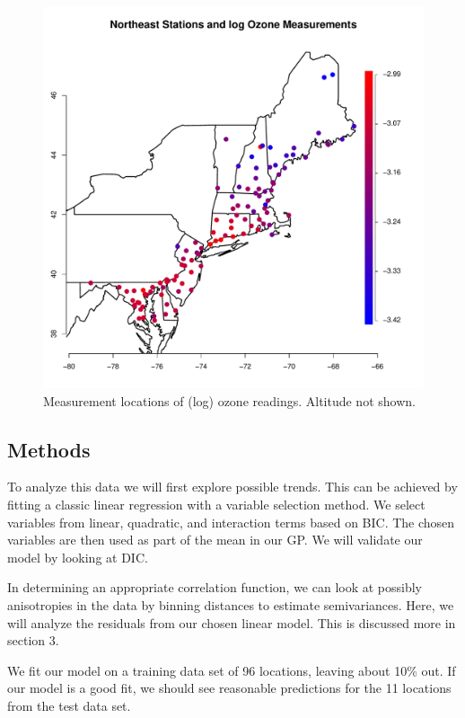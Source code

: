 \documentclass[12pt]{article}
\begin{document}
\begin{figure}[ht]
\begin{center}
\includegraphics[scale=0.40]{figs/data.pdf}
\end{center}
\caption{Measurement locations of (log) ozone readings. Altitude not shown.}
\end{figure}

\subsection{Methods}

To analyze this data we will first explore possible trends. This can be achieved by fitting a classic linear regression with a variable selection method. We select variables from linear, quadratic, and interaction terms based on BIC. The chosen variables are then used as part of the mean in our GP. We will validate our model by looking at DIC.
\bigskip

In determining an appropriate correlation function, we can look at possibly anisotropies in the data by binning distances to estimate semivariances. Here, we will analyze the residuals from our chosen linear model. This is discussed more in section 3.
\bigskip

We fit our model on a training data set of 96 locations, leaving about 10\% out. If our model is a good fit, we should see reasonable predictions for the 11 locations from the test data set.
\end{document}
